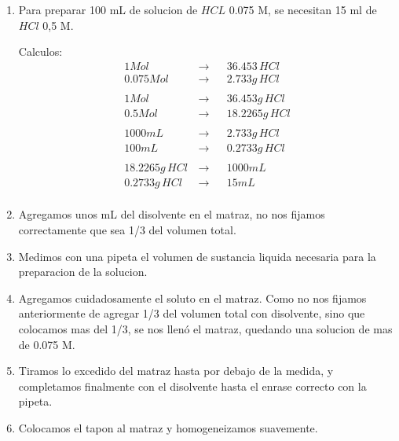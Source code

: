 \documentclass[12pt,a4paper]{report}
\begin{document}
\chapter{}
\begin{enumerate}[label=\alph*]
  \item Para preparar 100 mL de solucion de $HCL$ 0.075 M, se necesitan 15 ml de $HCl$ 0,5 M.

  Calculos:
      $$
\begin{aligned}
   1 Mol  \, &\rightarrow&& 36.453 \,HCl\\[6pt]
   0.075 Mol  \, &\rightarrow&&  2.733g \,HCl\\[6pt]
    \\
   1 Mol  \, &\rightarrow&& 36.453g \,HCl\\[6pt]
   0.5 Mol  \, &\rightarrow&&  18.2265g \,HCl\\[6pt]
    \\
   1000mL \,  &\rightarrow&& 2.733g \,HCl\\[6pt]
    100mL\,  &\rightarrow&& 0.2733g \,HCl\\[6pt]
    \\
   18.2265g \,HCl \,  &\rightarrow&& 1000 mL\\[6pt]
    0.2733 g \,HCl &\rightarrow&& 15 mL\\[6pt]
\end{aligned}
$$

  \item Agregamos unos mL del disolvente en el matraz, no nos fijamos correctamente que sea 1/3 del volumen total.

  \item Medimos con una pipeta el volumen de sustancia liquida necesaria para la preparacion de la solucion.

  \item Agregamos cuidadosamente el soluto en el matraz. Como no nos fijamos anteriormente de agregar 1/3 del volumen total con disolvente, sino que colocamos mas del 1/3, se nos llenó el matraz, quedando una solucion de mas de 0.075 M.

  \item Tiramos lo excedido del matraz hasta por debajo de la medida, y completamos finalmente con el disolvente hasta el enrase correcto con la pipeta.

  \item Colocamos el tapon al matraz y homogeneizamos suavemente.
\end{enumerate}

\chapter{}
\end{document}
